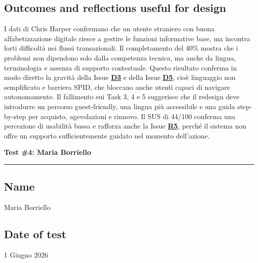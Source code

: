 \documentclass[11pt,a4paper]{article}
\begin{document}
\subsection*{Outcomes and reflections useful for design}
\begin{tcolorbox}[colback=backgroundColor,colframe=borderColor,arc=2mm]
I dati di Chris Harper confermano che un utente straniero con buona alfabetizzazione digitale riesce a gestire le funzioni informative base, ma incontra forti difficoltà nei flussi transazionali. Il completamento del 40\% mostra che i problemi non dipendono solo dalla competenza tecnica, ma anche da lingua, terminologia e assenza di supporto contestuale. Questo risultato conferma in modo diretto la gravità della Issue \textbf{\hyperref[iss:D3]{D3}} e della Issue \textbf{\hyperref[iss:D5]{D5}}, cioè linguaggio non semplificato e barriera SPID, che bloccano anche utenti capaci di navigare autonomamente. Il fallimento sui Task 3, 4 e 5 suggerisce che il redesign deve introdurre un percorso guest-friendly, una lingua più accessibile e una guida step-by-step per acquisto, agevolazioni e rinnovo. Il SUS di 44/100 conferma una percezione di usabilità bassa e rafforza anche la Issue \textbf{\hyperref[iss:R5]{R5}}, perché il sistema non offre un supporto sufficientemente guidato nel momento dell’azione.
\end{tcolorbox}

\newpage
\begin{center}
  {\color{primaryColor}\large\bfseries Test \#4: Maria Borriello}\\
  \vspace{0.1cm}
  \color{borderColor}\hrule
\end{center}

\vspace{0.5cm}

\subsection*{Name \normalfont\small\itshape}
\begin{tcolorbox}[colback=backgroundColor,colframe=borderColor,arc=2mm]
Maria Borriello
\end{tcolorbox}

\subsection*{Date of test}
\begin{tcolorbox}[colback=backgroundColor,colframe=borderColor,arc=2mm]
1 Giugno 2026
\end{tcolorbox}
\end{document}
